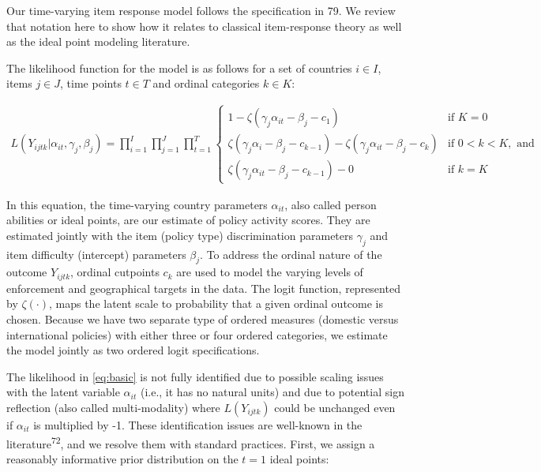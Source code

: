 \documentclass[]{article}
\begin{document}
Our time-varying item response model follows the specification in 79. We review that notation here to show how it relates to classical item-response theory as well as the ideal point modeling literature.

The likelihood function for the model is as follows for a set of countries \(i \in I\), items \(j \in J\), time points \(t \in T\) and ordinal categories \(k \in K\):

\begin{align}
    L(Y_{ijtk}|\alpha_{it},\gamma_j,\beta_j) =  \prod_{i=1}^{I} \prod_{j=1}^{J} \prod_{t=1}^{T}
    \begin{cases} 
    1 -  \zeta(\gamma_j \alpha_{it} - \beta_j - c_1) & \text{if } K = 0 \\
    \zeta(\gamma_j \alpha_i - \beta_j - c_{k-1}) - \zeta(\gamma_j \alpha_{it} - \beta_j - c_{k})       & \text{if } 0 < k < K, \text{ and} \\
    \zeta(\gamma_j \alpha_{it} - \beta_j - c_{k-1}) - 0 & \text{if } k=K
    \end{cases}
\label{eq:basic}
\end{align}

In this equation, the time-varying country parameters \(\alpha_{it}\), also called person abilities or ideal points, are our estimate of policy activity scores. They are estimated jointly with the item (policy type) discrimination parameters \(\gamma_j\) and item difficulty (intercept) parameters \(\beta_j\). To address the ordinal nature of the outcome \(Y_{ijtk}\), ordinal cutpoints \(c_{k}\) are used to model the varying levels of enforcement and geographical targets in the data. The logit function, represented by \(\zeta(\cdot)\), maps the latent scale to probability that a given ordinal outcome is chosen. Because we have two separate type of ordered measures (domestic versus international policies) with either three or four ordered categories, we estimate the model jointly as two ordered logit specifications.

The likelihood in \eqref{eq:basic} is not fully identified due to possible scaling issues with the latent variable \(\alpha_{it}\) (i.e., it has no natural units) and due to potential sign reflection (also called multi-modality) where \(L(Y_{ijtk})\) could be unchanged even if \(\alpha_{it}\) is multiplied by -1. These identification issues are well-known in the literature\textsuperscript{72}, and we resolve them with standard practices. First, we assign a reasonably informative prior distribution on the \(t=1\) ideal points:
\end{document}
